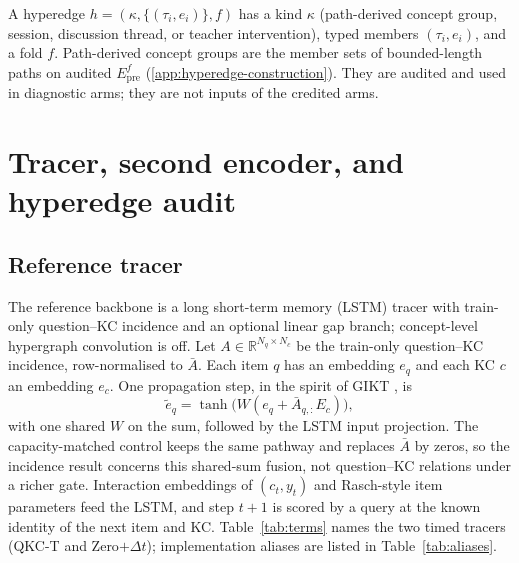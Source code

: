 \documentclass[review,12pt]{elsarticle}
\begin{document}
A hyperedge $h=(\kappa,\{(\tau_i,e_i)\},f)$ has a kind $\kappa$
(path-derived concept group, session, discussion thread, or teacher
intervention), typed members $(\tau_i,e_i)$, and a fold $f$.
Path-derived concept groups are the member sets of bounded-length paths
on audited $E_{\mathrm{pre}}^f$ (\ref{app:hyperedge-construction}).
They are audited and used in diagnostic arms; they are not inputs of
the credited arms.



\section{Tracer, second encoder, and hyperedge audit}
\label{sec:tracer}



\subsection{Reference tracer}
\label{sec:encoding}
The reference backbone is a long short-term memory (LSTM) tracer with
train-only question--KC
incidence and an optional linear gap branch; concept-level hypergraph
convolution is off. Let $A\in\mathbb{R}^{N_q\times N_c}$ be the
train-only question--KC incidence, row-normalised to $\bar{A}$. Each
item $q$ has an embedding $e_q$ and each KC $c$ an embedding $e_c$. One
propagation step, in the spirit of GIKT \cite{yang2021gikt}, is
\begin{equation}
\tilde{e}_q = \tanh\bigl(W(e_q + \bar{A}_{q,:}E_c)\bigr),
\label{eq:qkc}
\end{equation}
with one shared $W$ on the sum, followed by the LSTM input projection.
The capacity-matched control keeps the same pathway and replaces $\bar{A}$
by zeros, so the incidence result concerns this shared-sum fusion, not
question--KC relations under a richer gate. Interaction embeddings of
$(c_t,y_t)$ and Rasch-style item parameters
\cite{ghosh2020akt,liu2023simplekt} feed the LSTM, and step
$t{+}1$ is scored by a query at the known identity of the next item and
KC. Table~\ref{tab:terms} names the two timed tracers (QKC-T and
Zero$+\Delta t$); implementation aliases are listed in
Table~\ref{tab:aliases}.
\end{document}
